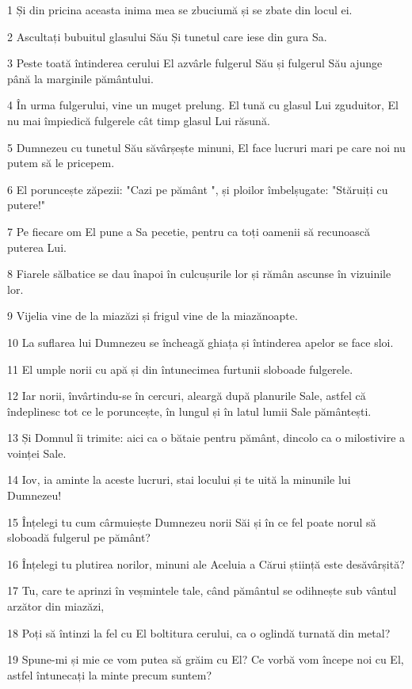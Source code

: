 \par 1 Și din pricina aceasta inima mea se zbuciumă și se zbate din locul ei.
\par 2 Ascultați bubuitul glasului Său Și tunetul care iese din gura Sa.
\par 3 Peste toată întinderea cerului El azvârle fulgerul Său și fulgerul Său ajunge până la marginile pământului.
\par 4 În urma fulgerului, vine un muget prelung. El tună cu glasul Lui zguduitor, El nu mai împiedică fulgerele cât timp glasul Lui răsună.
\par 5 Dumnezeu cu tunetul Său săvârșește minuni, El face lucruri mari pe care noi nu putem să le pricepem.
\par 6 El poruncește zăpezii: "Cazi pe pământ ", și ploilor îmbelșugate: "Stăruiți cu putere!"
\par 7 Pe fiecare om El pune a Sa pecetie, pentru ca toți oamenii să recunoască puterea Lui.
\par 8 Fiarele sălbatice se dau înapoi în culcușurile lor și rămân ascunse în vizuinile lor.
\par 9 Vijelia vine de la miazăzi și frigul vine de la miazănoapte.
\par 10 La suflarea lui Dumnezeu se încheagă ghiața și întinderea apelor se face sloi.
\par 11 El umple norii cu apă și din întunecimea furtunii sloboade fulgerele.
\par 12 Iar norii, învârtindu-se în cercuri, aleargă după planurile Sale, astfel că îndeplinesc tot ce le poruncește, în lungul și în latul lumii Sale pământești.
\par 13 Și Domnul îi trimite: aici ca o bătaie pentru pământ, dincolo ca o milostivire a voinței Sale.
\par 14 Iov, ia aminte la aceste lucruri, stai locului și te uită la minunile lui Dumnezeu!
\par 15 Înțelegi tu cum cârmuiește Dumnezeu norii Săi și în ce fel poate norul să sloboadă fulgerul pe pământ?
\par 16 Înțelegi tu plutirea norilor, minuni ale Aceluia a Cărui știință este desăvârșită?
\par 17 Tu, care te aprinzi în veșmintele tale, când pământul se odihnește sub vântul arzător din miazăzi,
\par 18 Poți să întinzi la fel cu El boltitura cerului, ca o oglindă turnată din metal?
\par 19 Spune-mi și mie ce vom putea să grăim cu El? Ce vorbă vom începe noi cu El, astfel întunecați la minte precum suntem?
